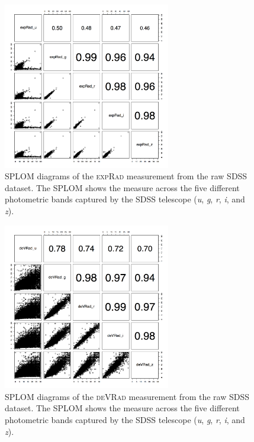 \documentclass[xcolor={table}]{beamer}
\newcommand{\featN}[1]{\textsc{#1}}
\begin{document}
 \begin{frame} [plain]
\begin{figure}[htb]
\centering
	\label{fig:SDSSRawDataSPLOM1}\includegraphics[width=0.65\textwidth]{./images/caseStudy2-expRad_SPLOM3.png}
\caption{SPLOM diagrams of the \featN{expRad} measurement from the raw SDSS dataset. The SPLOM shows the measure across the five different photometric bands captured by the SDSS telescope (\textit{u}, \textit{g}, \textit{r}, \textit{i}, and \textit{z}).}
\label{fig:SDSSRawDataSPLOMs}
\end{figure}
\end{frame} 

 \begin{frame} [plain]
\begin{figure}[htb]
\centering
	\label{fig:SDSSRawDataSPLOM2}\includegraphics[width=0.65\textwidth]{./images/caseStudy2-deVRad_SPLOM3.png}
\caption{SPLOM diagrams of the \featN{deVRad} measurement from the raw SDSS dataset. The SPLOM shows the measure across the five different photometric bands captured by the SDSS telescope (\textit{u}, \textit{g}, \textit{r}, \textit{i}, and \textit{z}).}
\label{fig:SDSSRawDataSPLOMs}
\end{figure}
\end{frame} 
\end{document}
